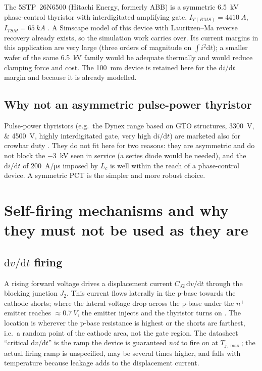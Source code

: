 \documentclass[11pt,a4paper]{article}
\begin{document}
The 5STP~26N6500 (Hitachi Energy, formerly ABB) is a symmetric \SI{6.5}{kV} phase-control
thyristor with interdigitated amplifying gate, $I_{T(RMS)} = \SI{4410}{A}$,
$I_{TSM} = \SI{65}{kA}$ \cite{ds26n6500}. A Simscape model of this device with Lauritzen--Ma
reverse recovery already exists, so the simulation work carries over. Its current margins in this
application are very large (three orders of magnitude on $\int i^2\mathrm{d}t$); a smaller wafer of
the same \SI{6.5}{kV} family would be adequate thermally and would reduce clamping force and cost.
The \SI{100}{mm} device is retained here for the $\mathrm{d}i/\mathrm{d}t$ margin and because it
is already modelled.

\subsection{Why not an asymmetric pulse-power thyristor}

Pulse-power thyristors (e.g.\ the Dynex range based on GTO structures, \SIlist{3300;4500}{V},
highly interdigitated gate, very high $\mathrm{d}i/\mathrm{d}t$) are marketed also for crowbar
duty \cite{dynexpp}. They do not fit here for two reasons: they are asymmetric and do not block
the \SI{-3}{kV} seen in service (a series diode would be needed), and the $\mathrm{d}i/\mathrm{d}t$
of \SI{200}{A/\micro s} imposed by $L_c$ is well within the reach of a phase-control device. A
symmetric PCT is the simpler and more robust choice.

\section{Self-firing mechanisms and why they must not be used as they are}
\label{sec:selffire}

\subsection{$\mathrm{d}v/\mathrm{d}t$ firing}

A rising forward voltage drives a displacement current $C_{J2}\,\mathrm{d}v/\mathrm{d}t$ through
the blocking junction $J_2$. This current flows laterally in the p-base towards the cathode
shorts; where the lateral voltage drop across the p-base under the $n^+$ emitter reaches
$\approx \SI{0.7}{V}$, the emitter injects and the thyristor turns on \cite{baliga}. The
location is wherever the p-base resistance is highest or the shorts are farthest, i.e.\ a random
point of the cathode area, not the gate region. The datasheet ``critical $\mathrm{d}v/\mathrm{d}t$''
is the ramp the device is guaranteed \emph{not} to fire on at $T_{j,\max}$; the actual firing
ramp is unspecified, may be several times higher, and falls with temperature because leakage adds
to the displacement current.
\end{document}
